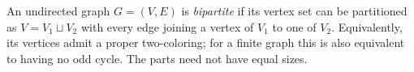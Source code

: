 
An undirected graph $G=(V,E)$ is \emph{bipartite} if its vertex set can be partitioned as $V=V_1\sqcup V_2$ with every edge joining a vertex of $V_1$ to one of $V_2$. Equivalently, its vertices admit a proper two-coloring; for a finite graph this is also equivalent to having no odd cycle. The parts need not have equal sizes.
